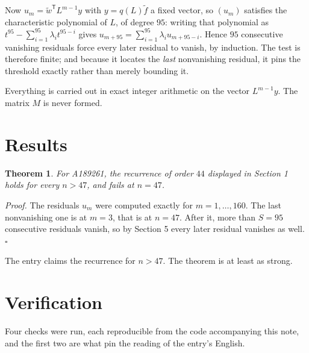 \documentclass[11pt]{article}
\newtheorem{theorem}{Theorem}
\theoremstyle{definition}
\begin{document}
Now $u_m = \tilde w^{\mathsf T} L^{m-1} y$ with $y = q(L)\tilde f$ a fixed vector, so $(u_m)$ satisfies the characteristic polynomial of $L$, of degree $95$: writing that polynomial as $t^{95} - \sum_{i=1}^{95} \lambda_i t^{95-i}$ gives $u_{m+95} = \sum_{i=1}^{95} \lambda_i u_{m+95-i}$. Hence $95$ consecutive vanishing residuals force every later residual to vanish, by induction. The test is therefore finite; and because it locates the {\itshape last} nonvanishing residual, it pins the threshold exactly rather than merely bounding it.

Everything is carried out in exact integer arithmetic on the vector $L^{m-1}y$. The matrix $M$ is never formed.

\section{Results}

\begin{theorem} For A189261, the recurrence of order $44$ displayed in Section 1 holds for every $n > 47$, and fails at $n = 47$.\end{theorem}

{\itshape Proof.} The residuals $u_m$ were computed exactly for $m = 1,\dots,160$. The last nonvanishing one is at $m = 3$, that is at $n = 47$. After it, more than $S = 95$ consecutive residuals vanish, so by Section 5 every later residual vanishes as well. $\square$

The entry claims the recurrence for $n > 47$. The theorem is at least as strong.

\section{Verification}

Four checks were run, each reproducible from the code accompanying this note, and the first two are what pin the reading of the entry's English.
\end{document}
